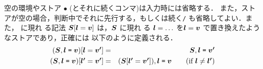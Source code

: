\documentclass[11pt]{jarticle}
\begin{document}
空の環境やストア \(\bullet\) (とそれに続くコンマ)は入力時には省略する．
また，ストアが空の場合，判断中でそれに先行する，もしくは続く\texttt{/}
も省略してよい．また， に現れ
る記法 \(\EvalRefMLiiiMV{s}\relax[\EvalRefMLiiiMV{l} =
\EvalRefMLiiiMV{v}]\) は，\(\EvalRefMLiiiMV{s}\) に現れ
る \(\EvalRefMLiiiMV{l} = \ldots\) を\(\EvalRefMLiiiMV{l} =
\EvalRefMLiiiMV{v}\) で置き換えたようなストアであり，正確には
以下のように定義される．
\begin{eqnarray*}
  (\EvalRefMLiiiBlockTerm{\EvalRefMLiiiMV{s}}{
    \EvalRefMLiiiMV{l}}{\EvalRefMLiiiMV{v}})
      [\EvalRefMLiiiMV{l} = \EvalRefMLiiiMV{v}[']] & = &
      \EvalRefMLiiiBlockTerm{\EvalRefMLiiiMV{s}}{
    \EvalRefMLiiiMV{l}}{\EvalRefMLiiiMV{v}[']} \\
  (\EvalRefMLiiiBlockTerm{\EvalRefMLiiiMV{s}}{
    \EvalRefMLiiiMV{l}}{\EvalRefMLiiiMV{v}})
      [\EvalRefMLiiiMV{l}['] = \EvalRefMLiiiMV{v}[']] & = &
  \EvalRefMLiiiBlockTerm{
    (\EvalRefMLiiiMV{s}{}[\EvalRefMLiiiMV{l}['] = \EvalRefMLiiiMV{v}[']])
   }{\EvalRefMLiiiMV{l}}{\EvalRefMLiiiMV{v}} \qquad
   \mbox{(if \(\EvalRefMLiiiMV{l} \neq \EvalRefMLiiiMV{l}[']\))}
\end{eqnarray*}
\end{document}
